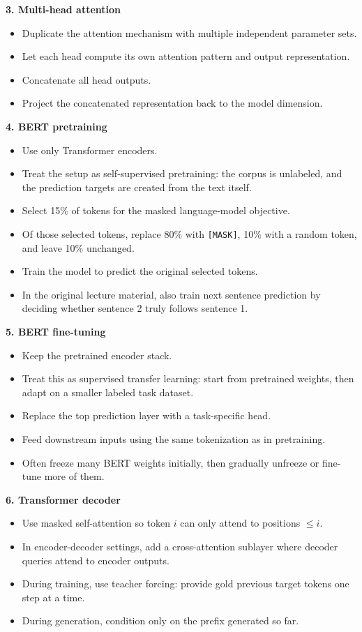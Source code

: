 \documentclass[11pt]{article}
\begin{document}
\textbf{3. Multi-head attention}
\begin{itemize}
    \item Duplicate the attention mechanism with multiple independent parameter sets.
    \item Let each head compute its own attention pattern and output representation.
    \item Concatenate all head outputs.
    \item Project the concatenated representation back to the model dimension.
\end{itemize}

\textbf{4. BERT pretraining}
\begin{itemize}
    \item Use only Transformer encoders.
    \item Treat the setup as self-supervised pretraining: the corpus is unlabeled, and the prediction targets are created from the text itself.
    \item Select 15\% of tokens for the masked language-model objective.
    \item Of those selected tokens, replace 80\% with \texttt{[MASK]}, 10\% with a random token, and leave 10\% unchanged.
    \item Train the model to predict the original selected tokens.
    \item In the original lecture material, also train next sentence prediction by deciding whether sentence 2 truly follows sentence 1.
\end{itemize}

\textbf{5. BERT fine-tuning}
\begin{itemize}
    \item Keep the pretrained encoder stack.
    \item Treat this as supervised transfer learning: start from pretrained weights, then adapt on a smaller labeled task dataset.
    \item Replace the top prediction layer with a task-specific head.
    \item Feed downstream inputs using the same tokenization as in pretraining.
    \item Often freeze many BERT weights initially, then gradually unfreeze or fine-tune more of them.
\end{itemize}

\textbf{6. Transformer decoder}
\begin{itemize}
    \item Use masked self-attention so token \(i\) can only attend to positions \(\le i\).
    \item In encoder-decoder settings, add a cross-attention sublayer where decoder queries attend to encoder outputs.
    \item During training, use teacher forcing: provide gold previous target tokens one step at a time.
    \item During generation, condition only on the prefix generated so far.
\end{itemize}
\end{document}
